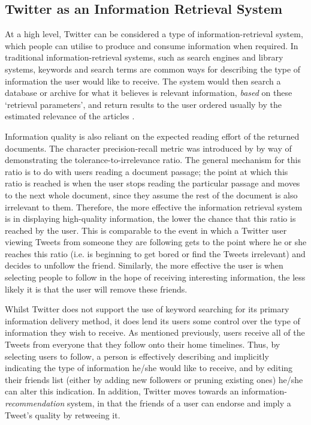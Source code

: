\subsection{Twitter as an Information Retrieval System}
At a high level, Twitter can be considered a type of information-retrieval system, which people can utilise to produce and consume information when required. In traditional information-retrieval systems, such as search engines and library systems, keywords and search terms are common ways for describing the type of information the user would like to receive. The system would then search a database or archive for what it believes is relevant information, \textit{based} on these `retrieval parameters', and return results to the user ordered usually by the estimated relevance of the articles \cite{arvola10}.

Information quality is also reliant on the expected reading effort of the returned documents. The character precision-recall metric was introduced by \citet{arvola10} by way of demonstrating the tolerance-to-irrelevance ratio. The general mechanism for this ratio is to do with users reading a document passage; the point at which this ratio is reached is when the user stops reading the particular passage and moves to the next whole document, since they assume the rest of the document is also irrelevant to them. Therefore, the more effective the information retrieval system is in displaying high-quality information, the lower the chance that this ratio is reached by the user. This is comparable to the event in which a Twitter user viewing Tweets from someone they are following gets to the point where he or she reaches this ratio (i.e. is beginning to get bored or find the Tweets irrelevant) and decides to unfollow the friend. Similarly, the more effective the user is when selecting people to follow in the hope of receiving interesting information, the less likely it is that the user will remove these friends.

Whilst Twitter does not support the use of keyword searching for its primary information delivery method, it does lend its users some control over the type of information they wish to receive. As mentioned previously, users receive all of the Tweets from everyone that they follow onto their home timelines. Thus, by selecting users to follow, a person is effectively describing and implicitly indicating the type of information he/she would like to receive, and by editing their friends list (either by adding new followers or pruning existing ones) he/she can alter this indication. In addition, Twitter moves towards an information-\textit{recommendation} system, in that the friends of a user can endorse and imply a Tweet's quality by retweeing it.


